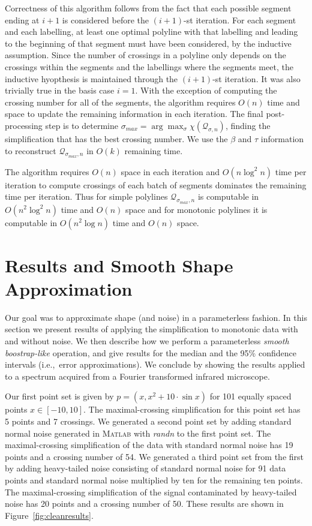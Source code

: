 \documentclass{article}
\begin{document}
Correctness of this algorithm follows from the fact that each possible
segment ending at $i+1$ is considered before the $(i+1)$-st iteration.  For
each segment and each labelling, at least one optimal polyline with that
labelling and leading to
the beginning of that segment must have been considered, by the inductive
assumption.  Since the number of crossings in a polyline
only depends on the crossings
within the segments and the labellings where the segments meet,
the inductive hyopthesis is maintained through the $(i+1)$-st iteration.
It was also trivially true in the basis case $i=1$.
With the exception of computing the crossing number for all of the segments,
the algorithm requires $O(n)$ time and space to update the remaining
information in each iteration.  The final post-processing step is to determine
$\sigma_{max} = \arg\max_{\sigma} \chi(\mathcal{Q}_{\sigma,n})$,
finding the simplification that has the best crossing number.
We use the $\beta$ and $\tau$ information to reconstruct
$\mathcal{Q}_{\sigma_{max},n}$ in $O(k)$ remaining time.

The algorithm requires $O(n)$ space in each iteration and $O(n\log^2 n)$
time per iteration to compute crossings of each batch of segments dominates
the remaining time per iteration.  Thus for simple polylines
$\mathcal{Q}_{\sigma_{max},n}$ is computable in $O(n^2\log^2 n)$ time and
$O(n)$ space and for monotonic polylines it is computable in $O(n^2\log n)$
time and $O(n)$ space.

\section{Results and Smooth Shape Approximation}
\label{sect:monotonicresults}

Our goal was to approximate shape (and noise) in a parameterless fashion.  In
this section we present results of applying the simplification to monotonic
data with and without noise.  We then describe how we perform a
parameterless \emph{smooth boostrap-like} operation, and give results for the
median and the 95\% confidence intervals (i.e.,~error approximations).  We
conclude by showing the results applied to a spectrum acquired from a
Fourier transformed infrared microscope.

Our first point set is given by $p=(x,x^2+10\cdot \sin x)$ for 101 equally
spaced points $x\in[-10,10]$.  The maximal-crossing simplification for this
point set has 5 points and 7 crossings.  We generated a second point set by
adding standard normal noise generated in \textsc{Matlab} with
\textit{randn} to the first point set.  The maximal-crossing simplification
of the data with standard normal noise has 19 points and a crossing number
of 54.  We generated a third point set from the first by adding
heavy-tailed noise consisting of standard normal noise for 91 data points
and standard normal noise multiplied by ten for the remaining ten points. 
The maximal-crossing simplification of the signal contaminated by
heavy-tailed noise has 20 points and a crossing number of 50.  These results
are shown in Figure~\ref{fig:cleanresults}.
	
\end{document}
